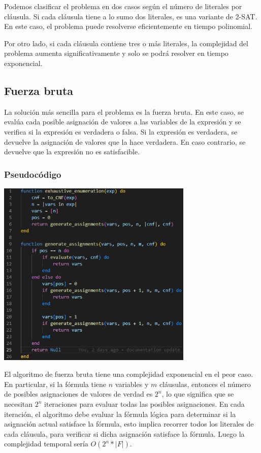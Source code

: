 \documentclass{article}
\begin{document}
    Podemos clasificar el problema en dos casos según el número 
    de literales por cláusula. Si cada cláusula tiene a lo sumo dos literales, es una variante de 2-SAT. 
    En este caso, el problema puede resolverse eficientemente en tiempo polinomial.

    Por otro lado, si cada cláusula contiene tres o más literales, la complejidad del problema 
    aumenta significativamente y solo se podrá resolver en tiempo exponencial.

    \subsection*{Fuerza bruta}

        La solución más sencilla para el problema es la fuerza bruta. En este caso, se evalúa 
        cada posible asignación de valores a las variables de la expresión y se verifica si la 
        expresión es verdadera o falsa. Si la expresión es verdadera, se devuelve la asignación 
        de valores que la hace verdadera. En caso contrario, se devuelve que la expresión no es 
        satisfacible.

        \subsubsection*{Pseudocódigo}

            \includegraphics[width = 0.7\textwidth]{resources/code1.png}

            El algoritmo de fuerza bruta tiene una complejidad exponencial en el peor caso. En 
            particular, si la fórmula tiene $n$ variables y $m$ cláusulas, entonces el número
            de posibles asignaciones de valores de verdad es $2^n$, lo que significa que se necesitan 
            $2^n$ iteraciones para evaluar todas las posibles asignaciones. En cada iteración, el 
            algoritmo debe evaluar la fórmula lógica para determinar si la asignación actual satisface la 
            fórmula, esto implica recorrer todos los literales de cada cláusula, para 
            verificar si dicha asignación satisface la fórmula. Luego la complejidad temporal 
            sería $O(2^n * |F|)$.
    
\end{document}
